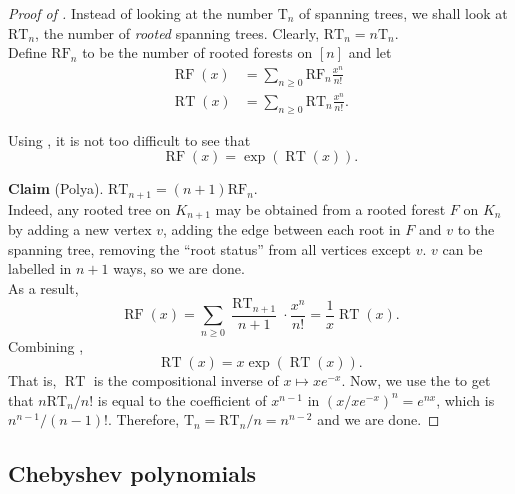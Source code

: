 	\begin{proof}[Proof of ]
		Instead of looking at the number $\text{T}_n$ of spanning trees, we shall look at $\text{RT}_n$, the number of \emph{rooted} spanning trees. Clearly, $\text{RT}_n = n \text{T}_n$.\\
		Define $\text{RF}_n$ to be the number of rooted forests on $[n]$ and let
		\begin{align*}
			\operatorname{RF}(x) &= \sum_{n \ge 0} \text{RF}_n \frac{x^n}{n!} \\
			\operatorname{RT}(x) &= \sum_{n \ge 0} \text{RT}_n \frac{x^n}{n!}.
		\end{align*}

		Using , it is not too difficult to see that
		\begin{equation}
			\label{eqn 1}
			\operatorname{RF}(x) = \exp(\operatorname{RT}(x)).
		\end{equation}

		\textbf{Claim} (Polya). $\text{RT}_{n+1} = (n+1) \text{RF}_n$.\\
		Indeed, any rooted tree on $K_{n+1}$ may be obtained from a rooted forest $F$ on $K_n$ by adding a new vertex $v$, adding the edge between each root in $F$ and $v$ to the spanning tree, removing the ``root status'' from all vertices except $v$. $v$ can be labelled in $n+1$ ways, so we are done.\\

		As a result,
		\begin{equation}
			\label{eqn 2}
			\operatorname{RF}(x) = \sum_{n\ge 0} \frac{\operatorname{RT}_{n+1}}{n+1} \cdot \frac{x^n}{n!} = \frac{1}{x} \operatorname{RT}(x).
		\end{equation}
		Combining ,
		\[ \operatorname{RT}(x) = x \exp(\operatorname{RT}(x)). \]
		That is, $\operatorname{RT}$ is the compositional inverse of $x \mapsto xe^{-x}$.
		Now, we use the  to get that $n\text{RT}_n/n!$ is equal to the coefficient of $x^{n-1}$ in $(x/xe^{-x})^n = e^{nx}$, which is $n^{n-1}/(n-1)!$. Therefore, $\text{T}_n = \text{RT}_n/n = n^{n-2}$ and we are done.
	\end{proof}


\subsection{Chebyshev polynomials}

